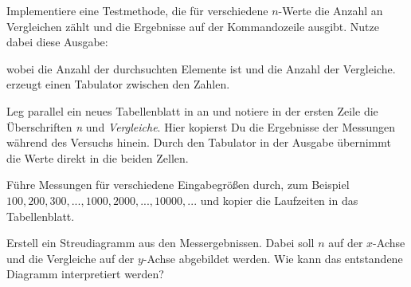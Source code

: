 \documentclass[10pt, a4paper, ngerman]{arbeitsblatt}
\begin{document}
\begin{aufgabe}[icon=\iconComputer]
	\label{aufg:tabelle-anlegen}
	Implementiere eine Testmethode, die für verschiedene $n$-Werte die Anzahl an Vergleichen zählt
	und die Ergebnisse auf der Kommandozeile ausgibt. Nutze dabei diese Ausgabe:


	wobei  die Anzahl der durchsuchten Elemente ist und  die Anzahl der Vergleiche.
	 erzeugt einen Tabulator zwischen den Zahlen.

	Leg parallel ein neues Tabellenblatt in  an und notiere in der
	ersten Zeile die Überschriften \emph{n} und \emph{Vergleiche}. Hier kopierst Du die Ergebnisse
	der Messungen während des Versuchs hinein. Durch den Tabulator in der Ausgabe übernimmt
	 die Werte direkt in die beiden Zellen.

	Führe Messungen für verschiedene Eingabegrößen durch, zum Beispiel
	$100, 200, 300, ..., 1000, 2000, ..., 10000, ...$ und kopier die Laufzeiten in das Tabellenblatt.
\end{aufgabe}

\begin{aufgabe}
	Erstell ein Streudiagramm aus den Messergebnissen. Dabei soll $n$ auf der $x$-Achse und die
	Vergleiche auf der $y$-Achse abgebildet werden. Wie kann das entstandene Diagramm interpretiert werden?
\end{aufgabe}
\end{document}
